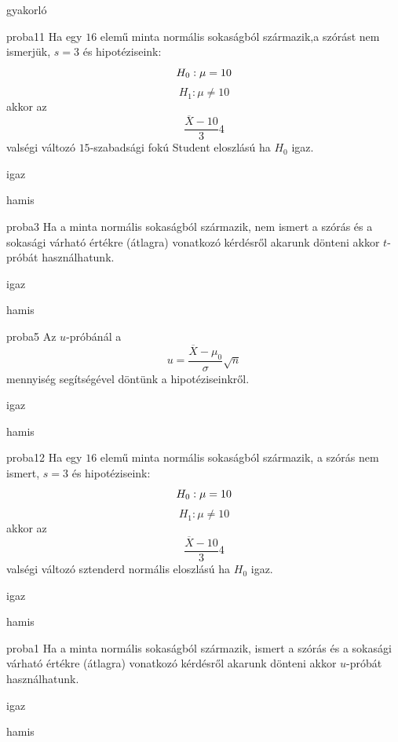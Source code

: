 \documentclass[12pt]{article}
\begin{document}
\begin{quiz}{gyakorló}

\begin{multi}[feedback={Igen, éppen ez alapján tudunk dönteni. Ahhoz képest hogy valségi változó $15$-szabadsági fokú Student eloszlású, átlagos, tipikus értéket, vagy kiugró, extrém értéket látunk.}]{proba11}
Ha egy $16$ elemű minta normális sokaságból származik,a szórást nem ismerjük, $s=3$ és hipotéziseink:
$$
H_0: \mu=10 \\
$$
$$
H_1: \mu\neq 10
$$
akkor az 
$$
\frac{\overline{X}-10}{3}4
$$
valségi változó $15$-szabadsági fokú Student eloszlású ha $H_0$ igaz.
\item* igaz
\item hamis
\end{multi}
\begin{multi}[feedback={Ezek az $t$-próba használatának előzményei.}]{proba3}
Ha a minta normális sokaságból származik, nem ismert a szórás és a sokasági várható értékre (átlagra) vonatkozó kérdésről 
akarunk dönteni akkor $t$-próbát használhatunk.
\item* igaz
\item hamis
\end{multi}
\begin{multi}[feedback={A fenti formula az $u$-próba ún. próbastatisztikája.}]{proba5}
Az $u$-próbánál a 
$$
u=\frac{\overline{X}-\mu_0}{\sigma}\sqrt{n}
$$
mennyiség segítségével döntünk a hipotéziseinkről.
\item* igaz
\item hamis
\end{multi}
\begin{multi}[feedback={A feltételek mellett a fenti Student (t) eloszlású.}]{proba12}
Ha egy $16$ elemű minta normális sokaságból származik, a szórás nem ismert, $s=3$ és hipotéziseink:
$$
H_0: \mu=10 \\
$$
$$
H_1: \mu\neq 10
$$
akkor az 
$$
\frac{\overline{X}-10}{3}4
$$
valségi változó sztenderd normális eloszlású ha $H_0$ igaz.
\item igaz
\item* hamis
\end{multi}
\begin{multi}[feedback={Ezek az $u$-próba használatának előzményei.}]{proba1}
Ha a minta normális sokaságból származik, ismert a szórás és a sokasági várható értékre (átlagra) vonatkozó kérdésről 
akarunk dönteni akkor $u$-próbát használhatunk.
\item* igaz
\item hamis

\end{multi}
\end{quiz}
\end{document}
